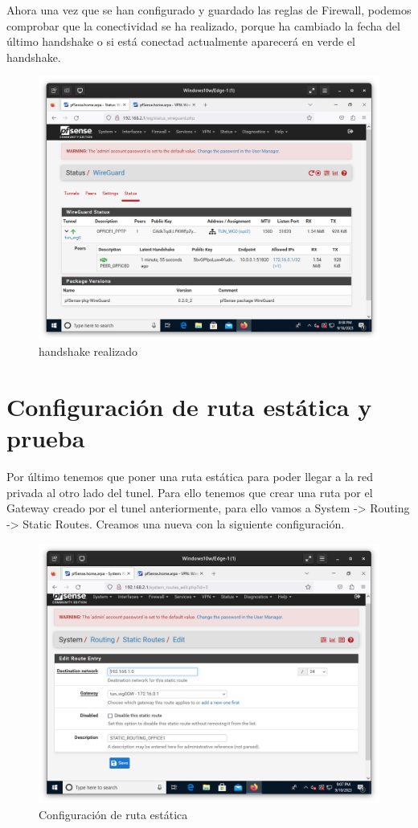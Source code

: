 Ahora una vez que se han configurado y guardado las reglas de Firewall, podemos comprobar que la conectividad se ha realizado, porque ha cambiado la fecha del último handshake o si está conectad actualmente aparecerá en verde el handshake.

\begin{figure}[H]
	\centering
	\includegraphics[scale=0.30]{13}
	\caption{handshake realizado}
\end{figure}

\newpage
\section{Configuración de ruta estática y prueba}

Por último tenemos que poner una ruta estática para poder llegar a la red privada al otro lado del tunel. Para ello tenemos que crear una ruta por el Gateway creado por el tunel anteriormente, para ello vamos a System -> Routing -> Static Routes. Creamos una nueva con la siguiente configuración.

\begin{figure}[H]
	\centering
	\includegraphics[scale=0.30]{14}
	\caption{Configuración de ruta estática}
\end{figure}

